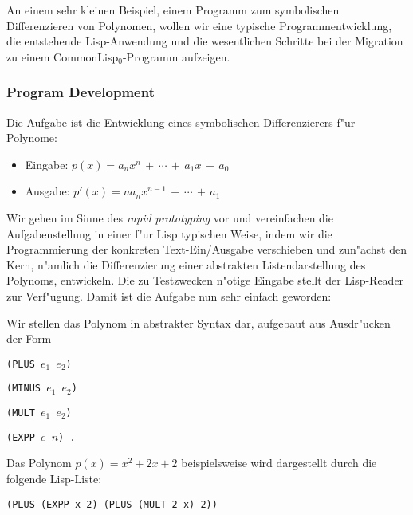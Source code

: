 An einem sehr kleinen Beispiel, einem Programm zum symbolischen
Differenzieren von Poly\-no\-men, wollen wir eine typische
Programmentwicklung, die entstehende Lisp-Anwendung und die
wesentlichen Schritte bei der Migration zu einem
CommonLisp$_0$-Programm aufzeigen.

\subsubsection*{Program Development}

Die Aufgabe ist die Entwicklung eines symbolischen Differenzierers
f"ur Polynome:

\pagebreak

\begin{center}
\begin{itemize}
\item[] Eingabe: \quad $p(x) = a_nx^n\,+\,\cdots\,+\,a_1x\,+\,a_0$
\item[] Ausgabe: \quad $p'(x) = na_nx^{n-1}\,+\,\cdots\,+\,a_1$
\end{itemize}
\end{center}

Wir gehen im Sinne des {\em rapid prototyping} vor und vereinfachen die
Aufgabenstellung in einer f"ur Lisp typischen Weise, indem wir die
Programmierung der konkreten Text-Ein/Ausgabe verschieben und zun"achst
den Kern, n"amlich die Differenzierung einer abstrakten Listendarstellung
des Polynoms, entwickeln. Die zu Testzwecken n"otige Eingabe stellt
der Lisp-Reader zur Verf"ugung. Damit ist die Aufgabe nun sehr einfach
geworden:

Wir stellen das Polynom in abstrakter Syntax dar, aufgebaut aus Ausdr"ucken
der Form\\[0.2cm]

\centerline{\tt (PLUS $e_1$ $e_2$)}
\centerline{\tt (MINUS $e_1$ $e_2$)}
\centerline{\tt (MULT $e_1$ $e_2$)}
\centerline{\tt (EXPP $e$ $n$)\,.}
\vspace*{0.2cm}

Das Polynom $p(x) = x^2 + 2x + 2$
beispielsweise wird dargestellt durch die folgende
Lisp-Liste:\\[0.1cm]

\centerline{\tt (PLUS (EXPP x 2) (PLUS (MULT 2 x) 2))}
\vspace*{0.4cm}

